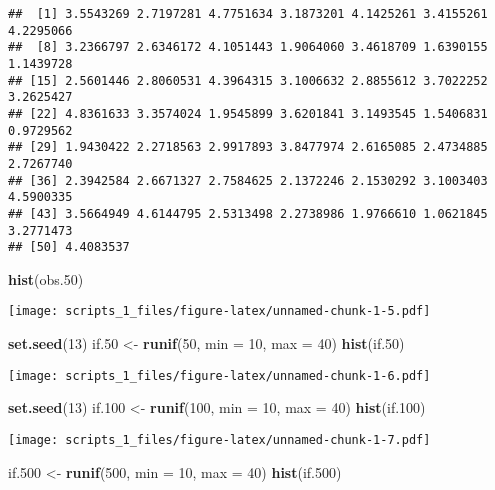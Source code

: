 \documentclass[
]{article}
\newenvironment{Shaded}{\begin{snugshade}}{\end{snugshade}}
\newcommand{\DataTypeTok}[1]{\textcolor[rgb]{0.13,0.29,0.53}{#1}}
\newcommand{\DecValTok}[1]{\textcolor[rgb]{0.00,0.00,0.81}{#1}}
\newcommand{\FloatTok}[1]{\textcolor[rgb]{0.00,0.00,0.81}{#1}}
\newcommand{\KeywordTok}[1]{\textcolor[rgb]{0.13,0.29,0.53}{\textbf{#1}}}
\newcommand{\NormalTok}[1]{#1}
\newcommand{\StringTok}[1]{\textcolor[rgb]{0.31,0.60,0.02}{#1}}
\begin{document}
\begin{verbatim}
##  [1] 3.5543269 2.7197281 4.7751634 3.1873201 4.1425261 3.4155261 4.2295066
##  [8] 3.2366797 2.6346172 4.1051443 1.9064060 3.4618709 1.6390155 1.1439728
## [15] 2.5601446 2.8060531 4.3964315 3.1006632 2.8855612 3.7022252 3.2625427
## [22] 4.8361633 3.3574024 1.9545899 3.6201841 3.1493545 1.5406831 0.9729562
## [29] 1.9430422 2.2718563 2.9917893 3.8477974 2.6165085 2.4734885 2.7267740
## [36] 2.3942584 2.6671327 2.7584625 2.1372246 2.1530292 3.1003403 4.5900335
## [43] 3.5664949 4.6144795 2.5313498 2.2738986 1.9766610 1.0621845 3.2771473
## [50] 4.4083537
\end{verbatim}

\begin{Shaded}
\begin{Highlighting}[]
\KeywordTok{hist}\NormalTok{(obs}\FloatTok{.50}\NormalTok{)}
\end{Highlighting}
\end{Shaded}

\texttt{[image: scripts\_1\_files/figure-latex/unnamed-chunk-1-5.pdf]}

\begin{Shaded}
\begin{Highlighting}[]
\KeywordTok{set.seed}\NormalTok{(}\DecValTok{13}\NormalTok{)}
\NormalTok{if}\FloatTok{.50}\NormalTok{ <-}\StringTok{ }\KeywordTok{runif}\NormalTok{(}\DecValTok{50}\NormalTok{, }\DataTypeTok{min =} \DecValTok{10}\NormalTok{, }\DataTypeTok{max =} \DecValTok{40}\NormalTok{)}
\KeywordTok{hist}\NormalTok{(if}\FloatTok{.50}\NormalTok{)}
\end{Highlighting}
\end{Shaded}

\texttt{[image: scripts\_1\_files/figure-latex/unnamed-chunk-1-6.pdf]}

\begin{Shaded}
\begin{Highlighting}[]
\KeywordTok{set.seed}\NormalTok{(}\DecValTok{13}\NormalTok{)}
\NormalTok{if}\FloatTok{.100}\NormalTok{ <-}\StringTok{ }\KeywordTok{runif}\NormalTok{(}\DecValTok{100}\NormalTok{, }\DataTypeTok{min =} \DecValTok{10}\NormalTok{, }\DataTypeTok{max =} \DecValTok{40}\NormalTok{)}
\KeywordTok{hist}\NormalTok{(if}\FloatTok{.100}\NormalTok{)}
\end{Highlighting}
\end{Shaded}

\texttt{[image: scripts\_1\_files/figure-latex/unnamed-chunk-1-7.pdf]}

\begin{Shaded}
\begin{Highlighting}[]
\NormalTok{if}\FloatTok{.500}\NormalTok{ <-}\StringTok{ }\KeywordTok{runif}\NormalTok{(}\DecValTok{500}\NormalTok{, }\DataTypeTok{min =} \DecValTok{10}\NormalTok{, }\DataTypeTok{max =} \DecValTok{40}\NormalTok{)}
\KeywordTok{hist}\NormalTok{(if}\FloatTok{.500}\NormalTok{)}
\end{Highlighting}
\end{Shaded}
\end{document}
